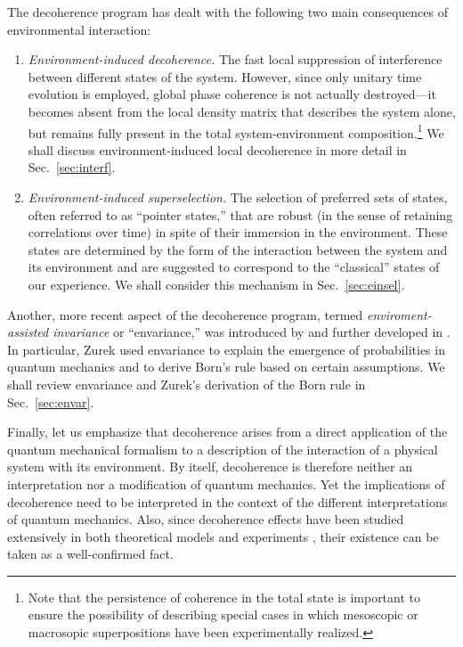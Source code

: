 \documentclass[rmp,aps,amsmath,amsfonts,noshowkeys,noshowpacs,12pt]{revtex4}
\begin{document}
The decoherence program has dealt with the following two main
consequences of environmental interaction:
%
\begin{enumerate}
  
\item[(1)] {\em Environment-induced decoherence.} The fast local
  suppression of interference between different states of the system.
  However, since only unitary time evolution is employed, global phase
  coherence is not actually destroyed---it becomes absent from the
  local density matrix that describes the system alone, but remains
  fully present in the total system-environment
  composition.\footnote{Note that the persistence of coherence in the
    total state is important to ensure the possibility of describing
    special cases in which mesoscopic or macrosopic superpositions have
    been experimentally realized.} We shall discuss
  environment-induced local decoherence in more detail in
  Sec.~\ref{sec:interf}.
  
\item[(2)] {\em Environment-induced superselection.} The selection of
  preferred sets of states, often referred to as ``pointer states,''
  that are robust (in the sense of retaining correlations over time)
  in spite of their immersion in the environment. These states are
  determined by the form of the interaction between the system and its
  environment and are suggested to correspond to the ``classical''
  states of our experience. We shall consider this mechanism in
  Sec.~\ref{sec:einsel}.

\end{enumerate}
%
Another, more recent aspect of the decoherence program, termed
\emph{enviroment-assisted invariance} or ``envariance,'' was
introduced by \citet{Zurek:2002:ii,Zurek:2003:rv,Zurek:2003:pl} and
further developed in \citet{Zurek:2004:yb}.  In particular, Zurek used
envariance to explain the emergence of probabilities in quantum
mechanics and to derive Born's rule based on certain assumptions. We
shall review envariance and Zurek's derivation of the Born rule in
Sec.~\ref{sec:envar}.

Finally, let us emphasize that decoherence arises from a direct
application of the quantum mechanical formalism to a description of
the interaction of a physical system with its environment. By itself,
decoherence is therefore neither an interpretation nor a modification
of quantum mechanics.  Yet the implications of decoherence need to be
interpreted in the context of the different interpretations of quantum
mechanics.  Also, since decoherence effects have been studied
extensively in both theoretical models and experiments \citep[for a
survey, see, for example,][]{Joos:2003:jh,Zurek:2002:ii}, their
existence can be taken as a well-confirmed fact.
\end{document}
